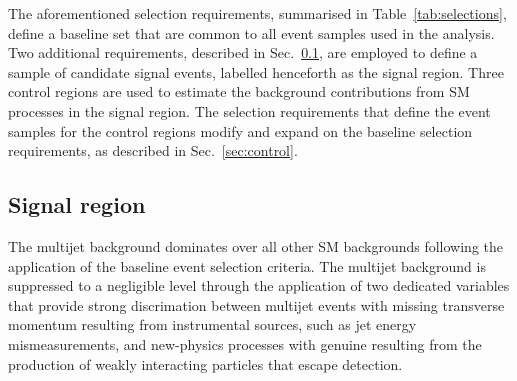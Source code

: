 The aforementioned selection requirements, summarised in
Table~\ref{tab:selections}, define a baseline set that are common to
all event samples used in the analysis. Two additional requirements,
described in Sec.~\ref{sec:signal}, are employed to define a sample of
candidate signal events, labelled henceforth as the signal
region. Three control regions are used to estimate the background
contributions from SM processes in the signal region. The selection
requirements that define the event samples for the control regions
modify and expand on the baseline selection requirements, as described
in Sec.~\ref{sec:control}.


\subsection{Signal region}
\label{sec:signal}

The multijet background dominates over all other SM backgrounds
following the application of the baseline event selection
criteria. The multijet background is suppressed to a negligible level
through the application of two dedicated variables that provide strong
discrimation between multijet events with missing transverse momentum
resulting from instrumental sources, such as jet energy
mismeasurements, and new-physics processes with genuine \ptvecmiss
resulting from the production of weakly interacting particles that
escape detection.

